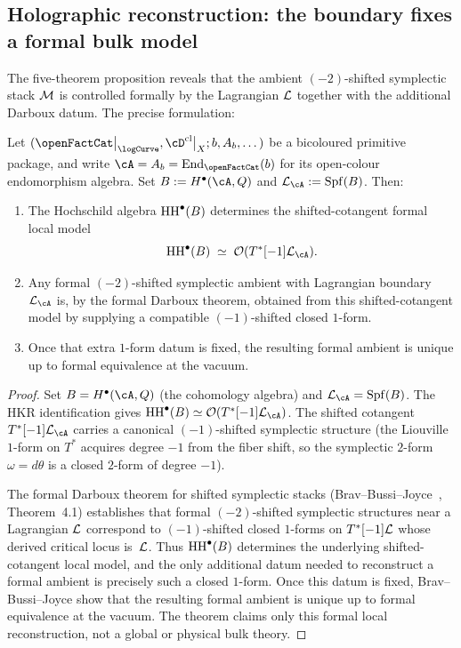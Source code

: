 \subsection{Holographic reconstruction: the boundary fixes a formal bulk model}
\label{ssec:holographic-reconstruction}

The five-theorem proposition reveals that the ambient
$(-2)$-shifted symplectic stack $\mathcal M$ is controlled formally by the
Lagrangian $\mathcal L$ together with the additional Darboux datum. The
precise formulation:

\begin{theorem}
\label{thm:holographic-reconstruction}
Let $(\openFactCat\big|_{\logCurve}, \cD^{\mathrm{cl}}\big|_X; b, A_b, \dots)$
be a bicoloured primitive package, and write
$\cA = A_b = \mathrm{End}_{\openFactCat}(b)$ for its open-colour
endomorphism algebra.
Set $B := H^\bullet(\cA,Q)$ and $\cL_\cA := \operatorname{Spf}(B)$.
Then:
\begin{enumerate}[label=\textup{(\roman*)}]
\item The Hochschild algebra $\operatorname{HH}^\bullet(B)$ determines the
 shifted-cotangent formal local model
 \[
 \HH^\bullet(B)\;\simeq\;\cO(T^*[-1]\cL_\cA).
 \]
\item Any formal $(-2)$-shifted symplectic ambient with
 Lagrangian boundary $\cL_\cA$ is, by the formal Darboux theorem,
 obtained from this shifted-cotangent model by supplying a
 compatible $(-1)$-shifted closed $1$-form.
\item Once that extra $1$-form datum is fixed, the resulting formal
 ambient is unique up to formal equivalence at the vacuum.
\end{enumerate}
\end{theorem}

\begin{proof}
Set $B = H^\bullet(\cA, Q)$ (the cohomology algebra) and
$\cL_\cA = \operatorname{Spf}(B)$. The HKR identification gives
$\HH^\bullet(B) \simeq \cO(T^*[-1]\cL_\cA)$. The shifted
cotangent $T^*[-1]\cL_\cA$ carries a canonical $(-1)$-shifted
symplectic structure (the Liouville $1$-form on $T^*$ acquires
degree $-1$ from the fiber shift, so the symplectic $2$-form
$\omega = d\theta$ is a closed $2$-form of degree $-1$).

The formal Darboux theorem for shifted symplectic stacks
(Brav--Bussi--Joyce~\cite{BBJ19}, Theorem~4.1) establishes
that formal $(-2)$-shifted symplectic structures near a
Lagrangian $\mathcal L$ correspond to $(-1)$-shifted closed $1$-forms
on $T^*[-1]\mathcal L$ whose derived critical locus is~$\mathcal L$.
Thus $\operatorname{HH}^\bullet(B)$ determines the underlying
shifted-cotangent local model, and the only additional datum
needed to reconstruct a formal ambient is precisely such a
closed $1$-form. Once this datum is fixed, Brav--Bussi--Joyce
show that the resulting formal ambient is unique up to formal
equivalence at the vacuum. The theorem claims only this formal
local reconstruction, not a global or physical bulk theory.
\end{proof}

